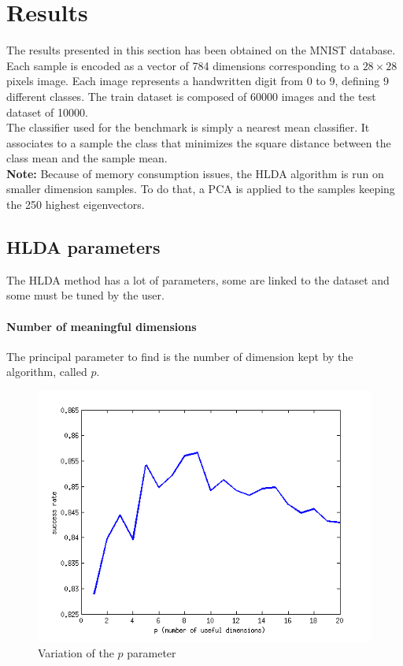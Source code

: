 
\section{Results}
\label{sec:results}

The results presented in this section has been obtained on the MNIST
database.  Each sample is encoded as a vector of 784 dimensions
corresponding to a $28 \times 28$ pixels image. Each image represents
a handwritten digit from 0 to 9, defining 9 different classes.
The train dataset is composed of 60000 images and the test dataset of 10000.\\

The classifier used for the benchmark is simply a nearest mean
classifier.  It associates to a sample the class that minimizes the
square distance between the class mean and
the sample mean.\\

{\bf Note:} Because of memory consumption issues, the HLDA algorithm
is run on smaller dimension samples. To do that, a PCA is applied to
the samples keeping the 250 highest eigenvectors.

\subsection{HLDA parameters}

The HLDA method has a lot of parameters, some are linked to the
dataset and some must be tuned by the user.

\paragraph{Number of meaningful dimensions} The principal parameter to
find is the number of dimension kept by the algorithm, called $p$.

\begin{figure}[H!]
  \includegraphics[scale=0.75]{img/bench-classes}
  \caption{Variation of the $p$ parameter}
  \label{img:classes}
\end{figure}

